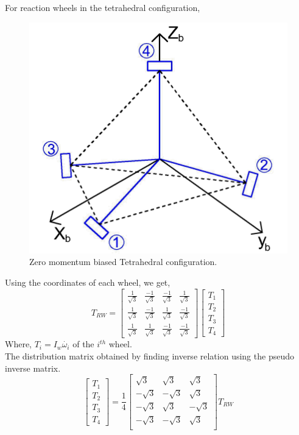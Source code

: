 \documentclass[10pt,a4paper]{report}
\begin{document}
For reaction wheels in the tetrahedral configuration, 
\begin{figure}[H]
\centering
\includegraphics[scale=0.5]{Tetconfig.png}
\caption{Zero momentum biased Tetrahedral configuration.}
\end{figure}

Using the coordinates of each wheel, we get,
\begin{equation}
T_{RW}=\begin{bmatrix}
\frac{1}{\sqrt{3}} &\frac{-1}{\sqrt{3}}&\frac{-1}{\sqrt{3}}&\frac{1}{\sqrt{3}} \\
\frac{1}{\sqrt{3}} &\frac{-1}{\sqrt{3}}&\frac{1}{\sqrt{3}}&\frac{-1}{\sqrt{3}} \\
\frac{1}{\sqrt{3}} &\frac{1}{\sqrt{3}}&\frac{-1}{\sqrt{3}}&\frac{-1}{\sqrt{3}} 
\end{bmatrix}
\begin{bmatrix}
T_{1}\\T_{2}\\T_{3}\\T_{4}
\end{bmatrix}
\end{equation}
Where, $ T_{i}=I_{w}\dot{\omega_{i}} $ of the $ i^{th} $ wheel.
\\The distribution matrix obtained by finding inverse relation using the pseudo inverse matrix.
\begin{equation}
\begin{bmatrix}
T_{1}\\T_{2}\\T_{3}\\T_{4}
\end{bmatrix}
=\frac{1}{4}\begin{bmatrix}
\sqrt{3}&\sqrt{3}&\sqrt{3}\\
-\sqrt{3}&-\sqrt{3}&\sqrt{3}\\
-\sqrt{3}&\sqrt{3}&-\sqrt{3}\\
-\sqrt{3}&-\sqrt{3}&\sqrt{3}\\
\end{bmatrix}
T_{RW}
\end{equation}
\end{document}
